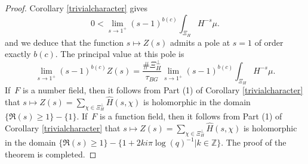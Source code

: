 \documentclass[a4paper,english,12pt]{amsart}
\newcommand{\ZZ}{\mathbb{Z}}
\newcommand{\doots}{,\dots ,}
\newcommand{\AAA}{\mathbb A}
\newcommand{\wH}{\widehat H}
\numberwithin{equation}{subsection}
\begin{document}
\begin{proof}
 Corollary \ref{trivialcharacter} gives $$0<\lim_{s\to 1^+} (s-1)^{b(c)}\int_{\Xi_H}H^{-s}\mu.$$ %
and we deduce that the function $s\mapsto Z(s)$ admits a pole at $s=1$ of order exactly $b(c).$ The principal value at this pole is $$\lim_{s\to 1^+}(s-1)^{b(c)}Z(s)=\frac{ \#\Xi_H^\perp}{\tau_{BG}}\lim_{s\to 1^+}(s-1)^{b(c)}\int_{\Xi_H}H^{-s}\mu.$$ 
If~$F$ is a number field, then it follows from Part (1) of Corollary \ref{trivialcharacter} that $s\mapsto Z(s)=\sum_{\chi\in\Xi_H^{\perp}}\wH(s,\chi)$ is holomorphic in the domain $\{\Re(s)\geq 1\}-\{1\}$. If~$F$ is a function field, then it follows from Part (1) of Corollary \ref{trivialcharacter} that $s\mapsto Z(s)=\sum_{\chi\in\Xi_H^{\perp}}\wH(s,\chi)$ is holomorphic in the domain $\{\Re(s)\geq 1\}-\{1+2ki\pi\log(q)^{-1}|k\in\ZZ\}$.  The proof of the theorem is completed.
\end{proof}
\end{document}
